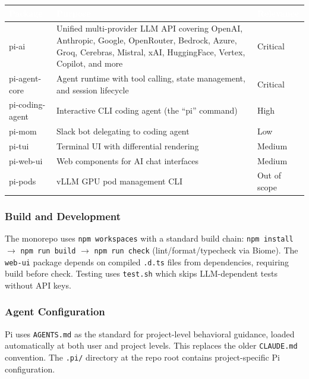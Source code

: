 \documentclass[11pt,letterpaper]{article}
\newcommand{\tableheader}[1]{\textbf{\sffamily\textcolor{white}{#1}}}
\begin{document}
\begin{center}
\begin{tabularx}{\textwidth}{L{3.8cm}XC{1.8cm}}
\toprule
{}
\tableheader{Package} & \tableheader{Purpose} & \tableheader{Relevance} \\
\midrule
pi-ai & Unified multi-provider LLM API covering OpenAI, Anthropic, Google, OpenRouter, Bedrock, Azure, Groq, Cerebras, Mistral, xAI, HuggingFace, Vertex, Copilot, and more & Critical \\
pi-agent-core & Agent runtime with tool calling, state management, and session lifecycle & Critical \\
pi-coding-agent & Interactive CLI coding agent (the ``pi'' command) & High \\
pi-mom & Slack bot delegating to coding agent & Low \\
pi-tui & Terminal UI with differential rendering & Medium \\
pi-web-ui & Web components for AI chat interfaces & Medium \\
pi-pods & vLLM GPU pod management CLI & Out of scope \\
\bottomrule
\end{tabularx}
\end{center}

\subsubsection{Build and Development}

The monorepo uses \texttt{npm workspaces} with a standard build chain: \texttt{npm install} $\rightarrow$ \texttt{npm run build} $\rightarrow$ \texttt{npm run check} (lint/format/typecheck via Biome). The \texttt{web-ui} package depends on compiled \texttt{.d.ts} files from dependencies, requiring build before check. Testing uses \texttt{test.sh} which skips LLM-dependent tests without API keys.

\subsubsection{Agent Configuration}

Pi uses \texttt{AGENTS.md} as the standard for project-level behavioral guidance, loaded automatically at both user and project levels. This replaces the older \texttt{CLAUDE.md} convention. The \texttt{.pi/} directory at the repo root contains project-specific Pi configuration.
\end{document}
